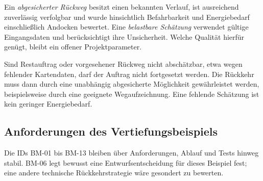 Ein \emph{abgesicherter Rückweg} besitzt einen bekannten Verlauf, ist ausreichend zuverlässig verfolgbar und wurde hinsichtlich Befahrbarkeit und Energiebedarf einschließlich Andocken bewertet. Eine \emph{belastbare Schätzung} verwendet gültige Eingangsdaten und berücksichtigt ihre Unsicherheit. Welche Qualität hierfür genügt, bleibt ein offener Projektparameter.

\begin{hinweisbox}
Sind Restauftrag oder vorgesehener Rückweg nicht abschätzbar, etwa wegen fehlender Kartendaten, darf der Auftrag nicht fortgesetzt werden. Die Rückkehr muss dann durch eine unabhängig abgesicherte Möglichkeit gewährleistet werden, beispielsweise durch eine geeignete Wegaufzeichnung. Eine fehlende Schätzung ist kein geringer Energiebedarf.
\end{hinweisbox}

\subsection{Anforderungen des Vertiefungsbeispiels}
Die IDs BM-01 bis BM-13 bleiben über Anforderungen, Ablauf und Tests hinweg stabil. BM-06 legt bewusst eine Entwurfsentscheidung für dieses Beispiel fest; eine andere technische Rückkehrstrategie wäre gesondert zu bewerten.

